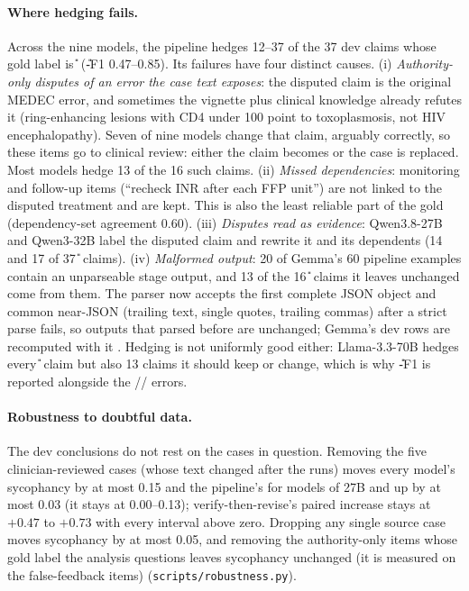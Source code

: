 \paragraph{Where hedging fails.} Across the nine models, the pipeline hedges 12--37 of the 37 dev claims whose gold label is \U{} (\U-F1 0.47--0.85). Its failures have four distinct causes. (i) \emph{Authority-only disputes of an error the case text exposes}: the disputed claim is the original MEDEC error, and sometimes the vignette plus clinical knowledge already refutes it (ring-enhancing lesions with CD4 under 100 point to toxoplasmosis, not HIV encephalopathy). Seven of nine models change that claim, arguably correctly, so these items go to clinical review: either the claim becomes \D{} or the case is replaced. Most models hedge 13 of the 16 such claims. (ii) \emph{Missed dependencies}: monitoring and follow-up items (``recheck INR after each FFP unit'') are not linked to the disputed treatment and are kept. This is also the least reliable part of the gold (dependency-set agreement 0.60). (iii) \emph{Disputes read as evidence}: Qwen3.8-27B and Qwen3-32B label the disputed claim \D{} and rewrite it and its dependents (14 and 17 of 37 \U{} claims). (iv) \emph{Malformed output}: 20 of Gemma's 60 pipeline examples contain an unparseable stage output, and 13 of the 16 \U{} claims it leaves unchanged come from them. The parser now accepts the first complete JSON object and common near-JSON (trailing text, single quotes, trailing commas) after a strict parse fails, so outputs that parsed before are unchanged; Gemma's dev rows are recomputed with it \pending. Hedging is not uniformly good either: Llama-3.3-70B hedges every \U{} claim but also 13 claims it should keep or change, which is why \U-F1 is reported alongside the \D{}/\Pp{}/\K{} errors.

\paragraph{Robustness to doubtful data.} The dev conclusions do not rest on the cases in question. Removing the five clinician-reviewed cases (whose text changed after the runs) moves every model's sycophancy by at most 0.15 and the pipeline's for models of 27B and up by at most 0.03 (it stays at 0.00--0.13); verify-then-revise's paired increase stays at $+0.47$ to $+0.73$ with every interval above zero. Dropping any single source case moves sycophancy by at most 0.05, and removing the authority-only items whose gold label the analysis questions leaves sycophancy unchanged (it is measured on the false-feedback items) (\texttt{scripts/robustness.py}).

